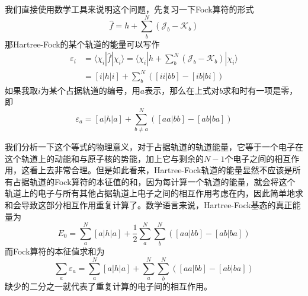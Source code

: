 \documentclass[12pt,a4paper,openany,twoside]{book}
\numberwithin{equation}{section}
\begin{document}
          我们直接使用数学工具来说明这个问题，先复习一下Fock算符的形式
          \begin{equation}
            \hat{f} = h + \sum_b^N (\mathscr{J}_b - \mathscr{K}_b)
          \end{equation}
          那Hartree-Fock的某个轨道的能量可以写作
          \begin{equation}
            \begin{aligned}
              \varepsilon_i &=  \langle\chi_i|\hat{f}|\chi_i\rangle = \langle\chi_i|h + \sum_b^N (\mathscr{J}_b - \mathscr{K}_b)|\chi_i\rangle\\
              &=[i|h|i] + \sum_b^N([ii|bb] - [ib|bi])
            \end{aligned}
            \label{orbital energy for HF orbitals}
          \end{equation}
          如果我取$i$为某个占据轨道的编号，用$a$表示，那么在上式对$b$求和时有一项是零，即
          \begin{equation}
            \varepsilon_a=[a|h|a] + \sum_{b\neq a}^N([aa|bb] - [ab|ba])
            \label{orbital energy for occupied}
          \end{equation}
          
          我们分析一下这个等式的物理意义，对于占据轨道的轨道能量，它等于一个电子在这个轨道上的动能和与原子核的势能，加上它与剩余的$N-1$个电子之间的相互作用，这看上去非常合理。但是如此看来，Hartree-Fock轨道的能量显然不应该是所有占据轨道的Fock算符的本征值的和，因为每计算一个轨道的能量，就会将这个轨道上的电子与所有其他占据轨道上电子之间的相互作用考虑在内，因此简单地求和会导致这部分相互作用重复计算了。数学语言来说，Hartree-Fock基态的真正能量为
          \begin{equation}
            E_0 = \sum_a^N [a|h|a] + \frac{1}{2}\sum_a^N \sum_b^N([aa|bb] - [ab|ba])
          \end{equation}
          而Fock算符的本征值求和为
          \begin{equation}
            \sum_a \varepsilon_a = \sum_a^N [a|h|a] + \sum_a^N \sum_b^N([aa|bb] - [ab|ba])
          \end{equation}
          缺少的二分之一就代表了重复计算的电子间的相互作用。
\end{document}
